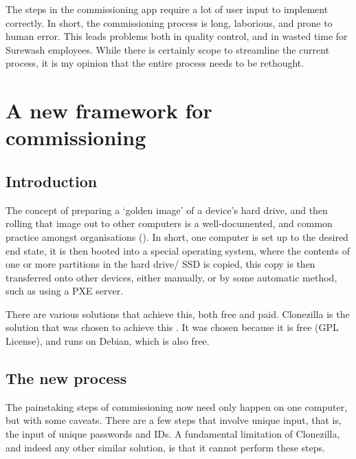 The steps in the commissioning app require a lot of user input to implement correctly. In short, the commissioning process is long, laborious, and prone to human error. This leads problems both in quality control, and in wasted time for Surewash employees. While there is certainly scope to streamline the current process, it is my opinion that the entire process needs to be rethought.

\section{A new framework for commissioning}
    \subsection{Introduction}
    The concept of preparing a `golden image' of a device's hard drive, and then rolling that image out to other computers is a well-documented, and common practice amongst organisations (\cite{msftdeployment}). In short, one computer is set up to the desired end state, it is then booted into a special operating system, where the contents of one or more partitions in the hard drive/ SSD is copied, this copy is then transferred onto other devices, either manually, or by some automatic method, such as using a PXE server.

    There are various solutions that achieve this, both free and paid. Clonezilla is the solution that was chosen to achieve this \cite{clonezilla}. It was chosen because it is free (GPL License), and runs on Debian, which is also free.
    \subsection{The new process}
    The painstaking steps of commissioning now need only happen on one computer, but with some caveats. There are a few steps that involve unique input, that is, the input of unique passwords and IDs. A fundamental limitation of Clonezilla, and indeed any other similar solution, is that it cannot perform these steps.